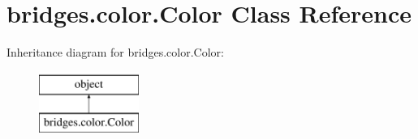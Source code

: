 \hypertarget{classbridges_1_1color_1_1_color}{}\section{bridges.\+color.\+Color Class Reference}
\label{classbridges_1_1color_1_1_color}
Inheritance diagram for bridges.\+color.\+Color\+:\begin{figure}[H]
\begin{center}
\leavevmode
\includegraphics[height=2.000000cm]{classbridges_1_1color_1_1_color}
\end{center}
\end{figure}
